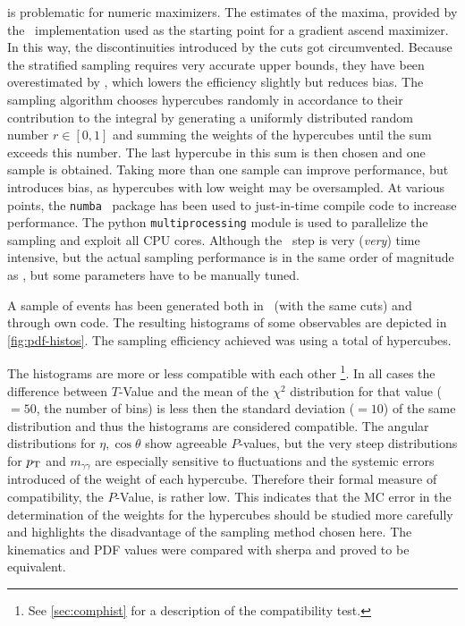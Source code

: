 is problematic for numeric maximizers.  The estimates of the maxima,
provided by the \vegas\ implementation used as the starting point for
a gradient ascend maximizer. In this way, the discontinuities
introduced by the cuts got circumvented. Because the stratified
sampling requires very accurate upper bounds, they have been
overestimated by \!, which lowers
the efficiency slightly but reduces bias. The sampling algorithm
chooses hypercubes randomly in accordance to their contribution to the
integral by generating a uniformly distributed random number
\(r\in [0,1]\) and summing the weights of the hypercubes until the sum
exceeds this number. The last hypercube in this sum is then chosen and
one sample is obtained. Taking more than one sample can improve
performance, but introduces bias, as hypercubes with low weight may be
oversampled. At various points, the \texttt{numba}~\cite{lam2015:po}
package has been used to just-in-time compile code to increase
performance. The python \texttt{multiprocessing} module is used to
parallelize the sampling and exploit all CPU cores. Although the
\vegas\ step is very (\emph{very}) time intensive, but the actual
sampling performance is in the same order of magnitude as \sherpa, but
some parameters have to be manually tuned.

A sample of  events has been
generated both in \sherpa\ (with the same cuts) and through own
code. The resulting histograms of some observables are depicted in
\cref{fig:pdf-histos}. The sampling efficiency achieved was
 using a total of
 hypercubes.

The histograms are more or less compatible with each other
\footnote{See \cref{sec:comphist} for a description of the
  compatibility test.}. In all cases the difference between
\(T\)-Value and the mean of the \(\chi^2\) distribution for that value
(\(=50\), the number of bins) is less then the standard deviation
(\(=10\)) of the same distribution and thus the histograms are
considered compatible. The angular distributions for
\(\eta, \cos\theta\) show agreeable \(P\)-values, but the very steep
distributions for \(p_\mathrm{T}\) and \(m_{\gamma\gamma}\) are especially
sensitive to fluctuations and the systemic errors introduced of the
weight of each hypercube. Therefore their formal measure of
compatibility, the \(P\)-Value, is rather low. This indicates that the
MC error in the determination of the weights for the hypercubes should
be studied more carefully and highlights the disadvantage of the
sampling method chosen here. The kinematics and PDF values were
compared with sherpa and proved to be equivalent.

